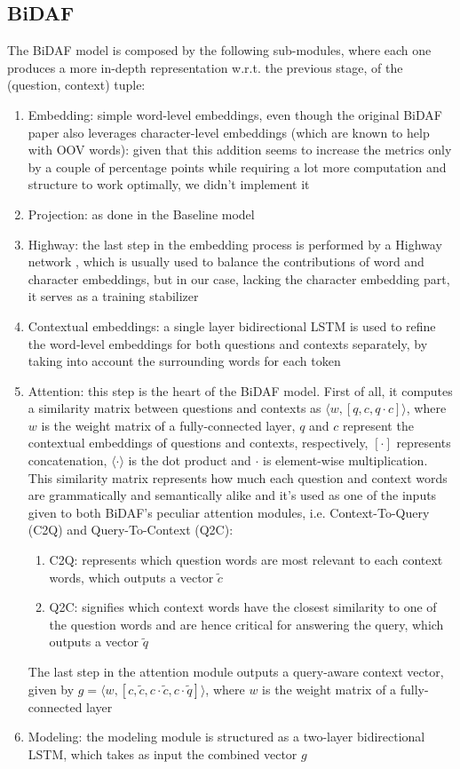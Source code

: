 \documentclass[a4paper,10pt]{report}
\begin{document}
\subsection{BiDAF}\label{subsec:bidaf}

The BiDAF model \cite{bidaf,bidaf-medium} is composed by the following sub-modules, where each one produces a more in-depth representation w.r.t. the previous stage, of the (question, context) tuple:
\begin{enumerate}
  \item Embedding: simple word-level embeddings, even though the original BiDAF paper also leverages character-level embeddings (which are known to help with OOV words): given that this addition seems to increase the metrics only by a couple of percentage points while requiring a lot more computation and structure to work optimally, we didn't implement it 
  \item Projection: as done in the Baseline model
  \item Highway: the last step in the embedding process is performed by a Highway network \cite{highway-network}, which is usually used to balance the contributions of word and character embeddings, but in our case, lacking the character embedding part, it serves as a training stabilizer
  \item Contextual embeddings: a single layer bidirectional LSTM is used to refine the word-level embeddings for both questions and contexts separately, by taking into account the surrounding words for each token
  \item Attention: this step is the heart of the BiDAF model. First of all, it computes a similarity matrix between questions and contexts as $\langle w, [q,c,q\cdot c]\rangle$, where $w$ is the weight matrix of a fully-connected layer, $q$ and $c$ represent the contextual embeddings of questions and contexts, respectively, $[\cdot]$ represents concatenation, $\langle\cdot\rangle$ is the dot product and $\cdot$ is element-wise multiplication. This similarity matrix represents how much each question and context words are grammatically and semantically alike and it's used as one of the inputs given to both BiDAF's peculiar attention modules, i.e. Context-To-Query (C2Q) and Query-To-Context (Q2C):
  \begin{enumerate}
    \item C2Q: represents which question words are most relevant to each context words, which outputs a vector $\tilde{c}$
    \item Q2C: signifies which context words have the closest similarity to one of the question words and are hence critical for answering the query, which outputs a vector $\tilde{q}$
  \end{enumerate}
  
  The last step in the attention module outputs a query-aware context vector, given by $g=\langle w, [c, \tilde{c}, c \cdot \tilde{c}, c\cdot \tilde{q}] \rangle$, where $w$ is the weight matrix of a fully-connected layer
  \item Modeling: the modeling module is structured as a two-layer bidirectional LSTM, which takes as input the combined vector $g$
\end{enumerate}
\end{document}
